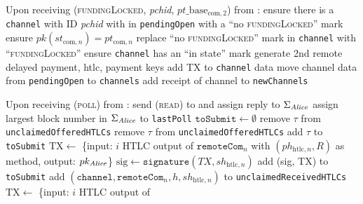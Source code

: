 \begin{algorithmic}[1]
    \State Upon receiving (\textsc{fundingLocked}, \textit{pchid},
    $pt\_\mathrm{base}_{\mathrm{com}, 2}$) from \bob:
    \Indent
      \State ensure there is a \texttt{channel} with ID \textit{pchid} with
      \bob{} in \texttt{pendingOpen} with a ``no \textsc{fundingLocked}'' mark
      \State ensure $pk\left(st_{\mathrm{com}, n}\right) = pt_{\mathrm{com}, n}$
      \State replace ``no \textsc{fundingLocked}'' mark in \texttt{channel} with
      ``\textsc{fundingLocked}''
      \State ensure \texttt{channel} has an ``in state'' mark
      \State generate 2nd remote delayed payment, htlc, payment keys
      \State add TX to \texttt{channel} data
      \State move channel data from \texttt{pendingOpen} to \texttt{channels}
      \State add receipt of channel to \texttt{newChannels}
    \EndIndent
    \State

    \State Upon receiving (\textsc{poll}) from \environment:
    \Indent
      \State send (\textsc{read}) to \ledger{} and assign reply to
      $\Sigma_{\mathit{Alice}}$
      \State assign largest block number in $\Sigma_{\mathit{Alice}}$ to
      \texttt{lastPoll}
    \State $\mathtt{toSubmit} \gets \emptyset$
         
          \State remove $\tau$ from \texttt{unclaimedOfferedHTLCs}
          \State remove $\tau$ from \texttt{unclaimedOfferedHTLCs}
          \State add $\tau$ to \texttt{toSubmit}
        \EndIf
      \EndFor
         
              \State $\mathrm{TX} \gets$ \{input: $i$ HTLC output of
              $\mathtt{remoteCom}_n$ with $\left(ph_{\mathrm{htlc}, n},
              R\right)$ as method, output: $pk_{\mathit{Alice}}$\}
              \State $\mathrm{sig} \gets \mathtt{signature}\left(TX,
              sh_{\mathrm{htlc}, n}\right)$
              \State add (sig, TX) to \texttt{toSubmit}
            \Else
              \State add $\left(\texttt{channel}, \mathtt{remoteCom}_n, h,
              sh_{\mathrm{htlc}, n}\right)$ to \texttt{unclaimedReceivedHTLCs}
            \EndIf
          \EndFor
            \State $\mathrm{TX} \gets$ \{input: $i$ HTLC output of

\end{algorithmic}

